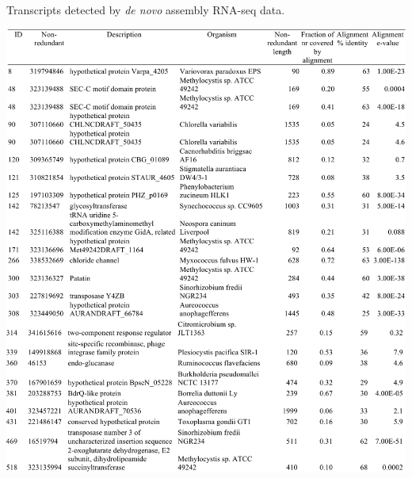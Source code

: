 \begin{table}[H]
\caption[Transcripts detected by \textit{de novo} assembly RNA-seq data]
	{Transcripts detected by \textit{de novo} assembly RNA-seq data.}
\label{table:ChA_S1}
\includegraphics[width=1.0\textwidth]{./tex/chapter1/figures/supplemental/TableS1a.pdf}
\end{table}

